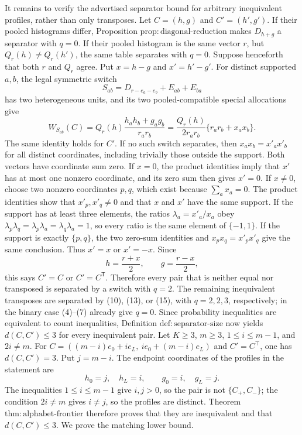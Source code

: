 It remains to verify the advertised separator bound for arbitrary inequivalent profiles, rather than only transposes. Let \(C=(h,g)\) and \(C'=(h',g')\). If their pooled histograms differ, Proposition \(\mathrm{prop{:}diagonal\text{-}reduction}\) makes \(D_{h+g}\) a separator with \(q=0\). If their pooled histogram is the same vector \(r\), but \(Q_r(h)\neq Q_r(h')\), the same table separates with \(q=0\). Suppose henceforth that both \(r\) and \(Q_r\) agree. Put \(x=h-g\) and \(x'=h'-g'\). For distinct supported \(a,b\), the legal symmetric switch
\[
 S_{ab}=D_{r-e_a-e_b}+E_{ab}+E_{ba}
\]
has two heterogeneous units, and its two pooled-compatible special allocations give
\[
 W_{S_{ab}}(C)
 =Q_r(h)\frac{h_ah_b+g_ag_b}{r_ar_b}
 =\frac{Q_r(h)}{2r_ar_b}\{r_ar_b+x_ax_b\}.
 \tag{17}
\]
The same identity holds for \(C'\). If no such switch separates, then \(x_ax_b=x'_ax'_b\) for all distinct coordinates, including trivially those outside the support. Both vectors have coordinate sum zero. If \(x=0\), the product identities imply that \(x'\) has at most one nonzero coordinate, and its zero sum then gives \(x'=0\). If \(x\neq0\), choose two nonzero coordinates \(p,q\), which exist because \(\sum_a x_a=0\). The product identities show that \(x'_p,x'_q\neq0\) and that \(x\) and \(x'\) have the same support. If the support has at least three elements, the ratios \(\lambda_a=x'_a/x_a\) obey \(\lambda_p\lambda_q=\lambda_p\lambda_a=\lambda_q\lambda_a=1\), so every ratio is the same element of \(\{-1,1\}\). If the support is exactly \(\{p,q\}\), the two zero-sum identities and \(x_px_q=x'_px'_q\) give the same conclusion. Thus \(x'=x\) or \(x'=-x\). Since
\[
 h=\frac{r+x}{2},\qquad g=\frac{r-x}{2},
\]
this says \(C'=C\) or \(C'=C^{\mathsf T}\). Therefore every pair that is neither equal nor transposed is separated by a switch with \(q=2\). The remaining inequivalent transposes are separated by (10), (13), or (15), with \(q=2,2,3\), respectively; in the binary case (4)--(7) already give \(q=0\). Since probability inequalities are equivalent to count inequalities, Definition \(\mathrm{def{:}separator\text{-}size}\) now yields \(d(C,C')\leq3\) for every inequivalent pair.
Let \(K\geq3\), \(m\geq3\), \(1\leq i\leq m-1\), and \(2i\neq m\). For \(C=((m-i)e_0+ie_L,\ ie_0+(m-i)e_L)\) and \(C'=C^\top\), one has \(d(C,C')=3\).
Put \(j=m-i\). The endpoint coordinates of the profiles in the statement are
\[
 h_0=j,\quad h_L=i,\qquad g_0=i,\quad g_L=j.
 \tag{1}
\]
The inequalities \(1\leq i\leq m-1\) give \(i,j>0\), so the pair is not \(\{C_+,C_-\}\); the condition \(2i\neq m\) gives \(i\neq j\), so the profiles are distinct. Theorem \(\mathrm{thm{:}alphabet\text{-}frontier}\) therefore proves that they are inequivalent and that \(d(C,C')\leq3\). We prove the matching lower bound.

